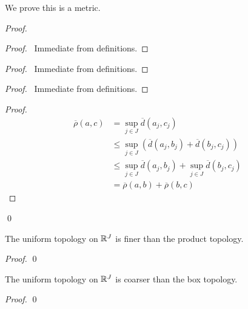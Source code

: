 We prove this is a metric.

\begin{proof}
    \pf
    \begin{proof}
        \pf\ Immediate from definitions.
    \end{proof}
    \begin{proof}
        \pf\ Immediate from definitions.
    \end{proof}
    \begin{proof}
        \pf\ Immediate from definitions.
    \end{proof}
    \begin{proof}
        \pf
        \begin{align*}
            \overline{\rho}(a,c) & = \sup_{j \in J} \overline{d}(a_j, c_j) \\
            & \leq \sup_{j \in J} (\overline{d}(a_j, b_j) + \overline{d}(b_j, c_j)) \\ 
            & \leq \sup_{j \in J} \overline{d}(a_j, b_j) + \sup_{j \in J} \overline{d}(b_j, c_j) \\
            & = \overline{\rho}(a,b) + \overline{\rho}(b,c)
        \end{align*}
    \end{proof}
    \qed
\end{proof}

\begin{proposition}
    The uniform topology on $\mathbb{R}^J$ is finer than the product topology.
\end{proposition}

\begin{proof}
    \pf
    \qed
\end{proof}

\begin{proposition}
    The uniform topology on $\mathbb{R}^J$ is coarser than the box topology.
\end{proposition}

\begin{proof}
    \pf
    \qed
\end{proof}

